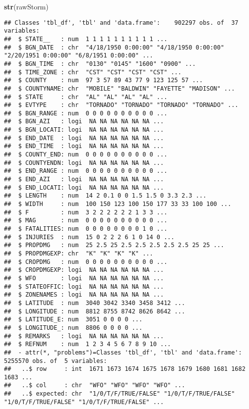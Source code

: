 \documentclass[
]{article}
\newenvironment{Shaded}{\begin{snugshade}}{\end{snugshade}}
\newcommand{\KeywordTok}[1]{\textcolor[rgb]{0.13,0.29,0.53}{\textbf{#1}}}
\newcommand{\NormalTok}[1]{#1}
\begin{document}
\begin{Shaded}
\begin{Highlighting}[]
\KeywordTok{str}\NormalTok{(rawStorm)}
\end{Highlighting}
\end{Shaded}

\begin{verbatim}
## Classes 'tbl_df', 'tbl' and 'data.frame':    902297 obs. of  37 variables:
##  $ STATE__   : num  1 1 1 1 1 1 1 1 1 1 ...
##  $ BGN_DATE  : chr  "4/18/1950 0:00:00" "4/18/1950 0:00:00" "2/20/1951 0:00:00" "6/8/1951 0:00:00" ...
##  $ BGN_TIME  : chr  "0130" "0145" "1600" "0900" ...
##  $ TIME_ZONE : chr  "CST" "CST" "CST" "CST" ...
##  $ COUNTY    : num  97 3 57 89 43 77 9 123 125 57 ...
##  $ COUNTYNAME: chr  "MOBILE" "BALDWIN" "FAYETTE" "MADISON" ...
##  $ STATE     : chr  "AL" "AL" "AL" "AL" ...
##  $ EVTYPE    : chr  "TORNADO" "TORNADO" "TORNADO" "TORNADO" ...
##  $ BGN_RANGE : num  0 0 0 0 0 0 0 0 0 0 ...
##  $ BGN_AZI   : logi  NA NA NA NA NA NA ...
##  $ BGN_LOCATI: logi  NA NA NA NA NA NA ...
##  $ END_DATE  : logi  NA NA NA NA NA NA ...
##  $ END_TIME  : logi  NA NA NA NA NA NA ...
##  $ COUNTY_END: num  0 0 0 0 0 0 0 0 0 0 ...
##  $ COUNTYENDN: logi  NA NA NA NA NA NA ...
##  $ END_RANGE : num  0 0 0 0 0 0 0 0 0 0 ...
##  $ END_AZI   : logi  NA NA NA NA NA NA ...
##  $ END_LOCATI: logi  NA NA NA NA NA NA ...
##  $ LENGTH    : num  14 2 0.1 0 0 1.5 1.5 0 3.3 2.3 ...
##  $ WIDTH     : num  100 150 123 100 150 177 33 33 100 100 ...
##  $ F         : num  3 2 2 2 2 2 2 1 3 3 ...
##  $ MAG       : num  0 0 0 0 0 0 0 0 0 0 ...
##  $ FATALITIES: num  0 0 0 0 0 0 0 0 1 0 ...
##  $ INJURIES  : num  15 0 2 2 2 6 1 0 14 0 ...
##  $ PROPDMG   : num  25 2.5 25 2.5 2.5 2.5 2.5 2.5 25 25 ...
##  $ PROPDMGEXP: chr  "K" "K" "K" "K" ...
##  $ CROPDMG   : num  0 0 0 0 0 0 0 0 0 0 ...
##  $ CROPDMGEXP: logi  NA NA NA NA NA NA ...
##  $ WFO       : logi  NA NA NA NA NA NA ...
##  $ STATEOFFIC: logi  NA NA NA NA NA NA ...
##  $ ZONENAMES : logi  NA NA NA NA NA NA ...
##  $ LATITUDE  : num  3040 3042 3340 3458 3412 ...
##  $ LONGITUDE : num  8812 8755 8742 8626 8642 ...
##  $ LATITUDE_E: num  3051 0 0 0 0 ...
##  $ LONGITUDE_: num  8806 0 0 0 0 ...
##  $ REMARKS   : logi  NA NA NA NA NA NA ...
##  $ REFNUM    : num  1 2 3 4 5 6 7 8 9 10 ...
##  - attr(*, "problems")=Classes 'tbl_df', 'tbl' and 'data.frame': 5255570 obs. of  5 variables:
##   ..$ row     : int  1671 1673 1674 1675 1678 1679 1680 1681 1682 1683 ...
##   ..$ col     : chr  "WFO" "WFO" "WFO" "WFO" ...
##   ..$ expected: chr  "1/0/T/F/TRUE/FALSE" "1/0/T/F/TRUE/FALSE" "1/0/T/F/TRUE/FALSE" "1/0/T/F/TRUE/FALSE" ...

\end{verbatim}
\end{document}
